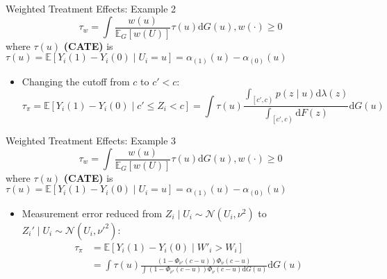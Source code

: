     \begin{frame}{Weighted Treatment Effects: Example 2}
        $$
        \tau_{w}=\int\frac{w\left(u\right)}{\mathbb{E}_{G}\left[w\left(U\right)\right]} {\tau\left(u\right)} \mathrm{d}G\left(u\right),w\left(\cdot\right)\geq 0
        $$
        where $\tau(u)$ {\textbf{(CATE)}} is $\tau\left(u\right)=\mathbb{E}\left[Y_{i}\left(1\right)-Y_{i}\left(0\right)\mid U_{i}=u\right]=\alpha_{\left(1\right)}\left(u\right)-\alpha_{\left(0\right)}\left(u\right)$
        \vspace*{15pt}
            \begin{itemize}
                \item Changing the cutoff from $c$ to $c'<c$: 
                $$
                \tau_{\pi}=\mathbb{E}\left[Y_{i}\left(1\right)-Y_{i}\left(0\right)\mid c'\leq Z_{i}<c\right]= \int\tau\left(u\right)\frac{\int_{\left[c',c\right)}p\left(z\mid u\right)\mathrm{d}\lambda\left(z\right)}{\int_{\left[c',c\right)}\mathrm{d}F\left(z\right)}\mathrm{d}G\left(u\right)
                $$
            \end{itemize}
        
    \end{frame}

    \begin{frame}{Weighted Treatment Effects: Example 3}
        $$
        \tau_{w}=\int\frac{w\left(u\right)}{\mathbb{E}_{G}\left[w\left(U\right)\right]} {\tau\left(u\right)} \mathrm{d}G\left(u\right),w\left(\cdot\right)\geq 0
        $$
        where $\tau(u)$ \textcolor{mygreen}{\textbf{(CATE)}} is $\tau\left(u\right)=\mathbb{E}\left[Y_{i}\left(1\right)-Y_{i}\left(0\right)\mid U_{i}=u\right]=\alpha_{\left(1\right)}\left(u\right)-\alpha_{\left(0\right)}\left(u\right)$
        \vspace*{15pt}
            \begin{itemize}
                \item Measurement error reduced from $Z_i\mid U_i\sim \mathcal{N}(U_i,\nu^2)$ to $Z_i'\mid U_i \sim \mathcal{N}(U_i,{\nu'}^2)$: 
                \begin{align*}
                    \tau_{\pi}&=\mathbb{E}\left[Y_{i}\left(1\right)-Y_{i}\left(0\right)\mid W'_{i}>W_{i}\right] \\
                    &= \int\tau\left(u\right)\frac{\left(1-\Phi_{\nu'}\left(c-u\right)\right)\Phi_{\nu}\left(c-u\right)}{\int\left(1-\Phi_{\nu'}\left(c-u\right)\right)\Phi_{\nu}\left(c-u\right)\mathrm{d}G\left(u\right)}\mathrm{d}G\left(u\right)
                \end{align*}
            \end{itemize}
        
    \end{frame}

